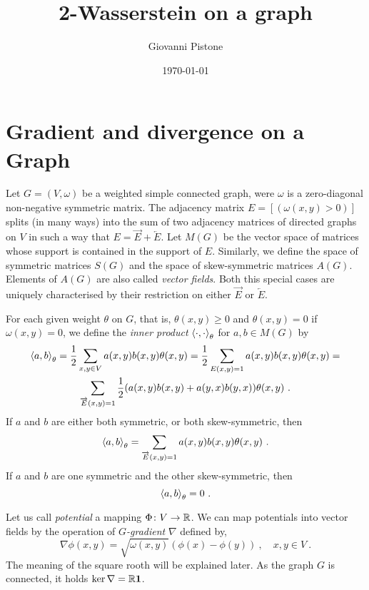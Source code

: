 \documentclass[12pt,a4paper]{amsart}
\title{2-Wasserstein on a graph}
\author{Giovanni Pistone}
\date{\today}
\begin{document}
\maketitle

\section{Gradient and divergence on a Graph}

Let $G = (V,\omega)$ be a weighted simple connected graph, were
$\omega$ is a zero-diagonal non-negative symmetric matrix. The
adjacency matrix $E = [(\omega(x,y) > 0)]$ splits (in many ways) into
the sum of two adjacency matrices of directed graphs on $V$ in such a
way that $E = \overrightarrow E + \overleftarrow E$. Let $M(G)$ be the
vector space of matrices whose support is contained in the support of
$E$. Similarly, we define the space of symmetric matrices $S(G)$ and
the space of skew-symmetric matrices $A(G)$. Elements of $A(G)$ are
also called \emph{vector fields}. Both this special cases are uniquely
characterised by their restriction on either $\overrightarrow E$ or
$\overleftarrow E$.

For each given weight $\theta$ on $G$, that is, $\theta(x,y) \geq 0$
and $\theta(x,y) = 0$ if $\omega(x,y) = 0$, we define the \emph{inner
  product} $\left\langle\cdot,\cdot\right\rangle_{\theta}$ for $a,b \in M(G)$ by
\begin{multline*}
  \left\langle a,b\right\rangle_{\theta} = \frac 12 \sum _ {x,y \in V} a(x,y)
  b(x,y)\theta(x,y) = \frac 12 \sum _ {E(x,y)=1} a(x,y)
  b(x,y)\theta(x,y) = \\ \sum_{\overrightarrow E(x,y)=1}
  \frac12(a(x,y)b(x,y)+a(y,x)b(y,x)) \theta(x,y)\ .
\end{multline*}
If $a$ and $b$ are either both symmetric, or both skew-symmetric, then
\begin{equation*}
  \left\langle a,b\right\rangle_{\theta} = \sum_{\overrightarrow E(x,y)=1}
  a(x,y)b(x,y) \theta(x,y) \ .
\end{equation*}
If $a$ and $b$ are one symmetric and the other skew-symmetric, then
\begin{equation*}
  \left\langle a,b\right\rangle_{\theta} = 0 \ .
\end{equation*}

Let us call \emph{potential} a mapping $\Phi \colon V \to \mathbb{R}$. We
can map potentials into vector fields by the operation of
\emph{$G$-gradient} $\nabla$ defined by,
\begin{equation*}
  \nabla \phi(x,y) = \sqrt {\omega(x,y)} (\phi(x) - \phi(y)) \ , \quad
  x,y \in V \ .
\end{equation*}
The meaning of the square rooth will be explained later. As the graph
$G$ is connected, it holds $\ker \nabla = \mathbb{R} \bm 1$.
\end{document}
